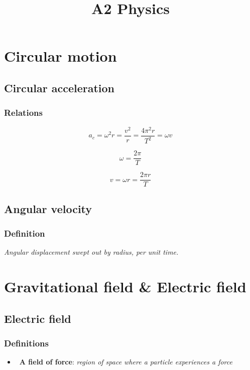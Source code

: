 \documentclass[a4paper,9pt]{scrartcl}
\title{A2 Physics}
\begin{document}
    \section{Circular motion}

    \subsection{Circular acceleration}

    \subsubsection{Relations}
    \begin{displaymath}
        a_c = \omega^{2}r = \frac{v^2}{r} = \frac{4\pi^{2}r}{T^{2}} = {\omega}v
    \end{displaymath}

    \begin{displaymath}
        \omega = \frac{2\pi}{T}
    \end{displaymath}

    \begin{displaymath}
        v = {\omega}r = \frac{2{\pi}r}{T}
    \end{displaymath}

    \subsection{Angular velocity}

    \subsubsection{Definition}
    \textit{Angular displacement swept out by radius, per unit time.}


    \section{Gravitational field \& Electric field}

    \subsection{Electric field}

    \subsubsection{Definitions}
    \begin{itemize}
        \item~\textbf{A field of force}: \textit{region of space where a particle experiences a force}
    \end{itemize}
\end{document}

